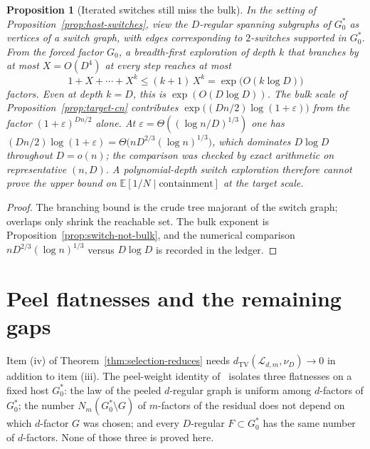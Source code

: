 \documentclass[11pt]{article}
\newtheorem{proposition}[theorem]{Proposition}
\newcommand{\EE}{\mathbb{E}}
\newcommand{\dTV}{d_{\mathrm{TV}}}
\begin{document}
\begin{proposition}[Iterated switches still miss the bulk]
\label{prop:switch-iterated}
In the setting of Proposition~\ref{prop:host-switches}, view the \(D\)-regular
spanning subgraphs of \(G^*_0\) as vertices of a switch graph, with edges
corresponding to \(2\)-switches supported in \(G^*_0\).
From the forced factor \(G_0\), a breadth-first exploration of depth \(k\) that
branches by at most \(X=O(D^4)\) at every step reaches at most
\[
1+X+\cdots+X^k
\le
(k+1)\,X^k
=
\exp\bigl(O(k\log D)\bigr)
\]
factors.
Even at depth \(k=D\), this is \(\exp(O(D\log D))\).
The bulk scale of Proposition~\ref{prop:target-cn} contributes
\(\exp\bigl((Dn/2)\log(1+\varepsilon)\bigr)\) from the factor
\((1+\varepsilon)^{Dn/2}\) alone.
At \(\varepsilon=\Theta((\log n/D)^{1/3})\) one has
\((Dn/2)\log(1+\varepsilon)=\Theta\bigl(n D^{2/3}(\log n)^{1/3}\bigr)\), which
dominates \(D\log D\) throughout \(D=o(n)\); the comparison was checked by
exact arithmetic on representative \((n,D)\).
A polynomial-depth switch exploration therefore cannot prove the upper bound
on \(\EE[1/N\mid\text{containment}]\) at the target scale.
\end{proposition}

\begin{proof}
The branching bound is the crude tree majorant of the switch graph; overlaps
only shrink the reachable set.
The bulk exponent is Proposition~\ref{prop:switch-not-bulk}, and the numerical
comparison \(n D^{2/3}(\log n)^{1/3}\) versus \(D\log D\) is recorded in the
ledger.
\end{proof}

\section{Peel flatnesses and the remaining gaps}
\label{sec:peel-gaps}

Item (iv) of Theorem~\ref{thm:selection-reduces} needs
\(\dTV(\mathcal{L}_{d,m},\nu_D)\to 0\) in addition to item (iii).
The peel-weight identity of~\cite{PlusOneV1} isolates three flatnesses on a
fixed host \(G^*_0\): the law of the peeled \(d\)-regular graph is uniform among
\(d\)-factors of \(G^*_0\); the number \(N_m(G^*_0\setminus G)\) of \(m\)-factors of
the residual does not depend on which \(d\)-factor \(G\) was chosen; and every
\(D\)-regular \(F\subset G^*_0\) has the same number of \(d\)-factors.
None of those three is proved here.
\end{document}
